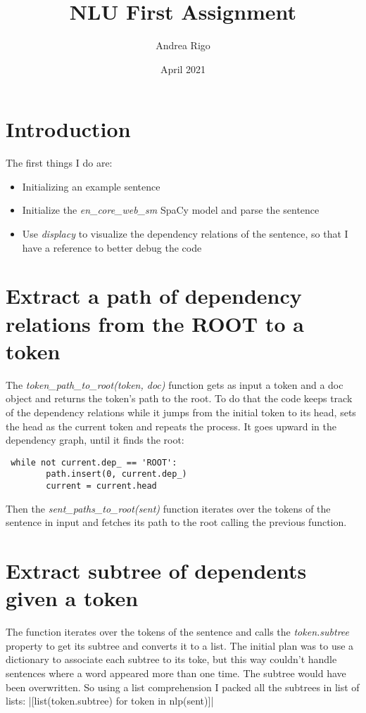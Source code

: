 \documentclass[a4paper]{article}
\title{\textbf{NLU First Assignment}}
\author{Andrea Rigo}
\date{April 2021}
\begin{document}
\maketitle

\section{Introduction}
The first things I do are:
    \begin{itemize}
        \item Initializing an example sentence
        \item Initialize the \textit{en\_core\_web\_sm} SpaCy model and parse the sentence
        \item Use \textit{displacy} to visualize the dependency relations of the sentence, so that I have a reference to better debug the code
    \end{itemize}

\section{Extract a path of dependency relations from the ROOT to a token}
The \textit{token\_path\_to\_root(token, doc)} function gets as input a token and a doc object and returns the token's path to the root. To do that the code keeps track of the dependency relations while it jumps from the initial token to its head, sets the head as the current token and repeats the process. It goes upward in the dependency graph, until it finds the root:
\begin{verbatim}
 while not current.dep_ == 'ROOT':
        path.insert(0, current.dep_)
        current = current.head
\end{verbatim}

Then the \textit{sent\_paths\_to\_root(sent)} function iterates over the tokens of the sentence in input and fetches its path to the root calling the previous function.

\section{Extract subtree of dependents given a token}
The function iterates over the tokens of the sentence and calls the \textit{token.subtree} property to get its subtree and converts it to a list. The initial plan was to use a dictionary to associate each subtree to its toke, but this way couldn't handle sentences where a word appeared more than one time. The subtree would have been overwritten. So using a list comprehension I packed all the subtrees in list of lists:
|[list(token.subtree) for token in nlp(sent)]|
\end{document}
